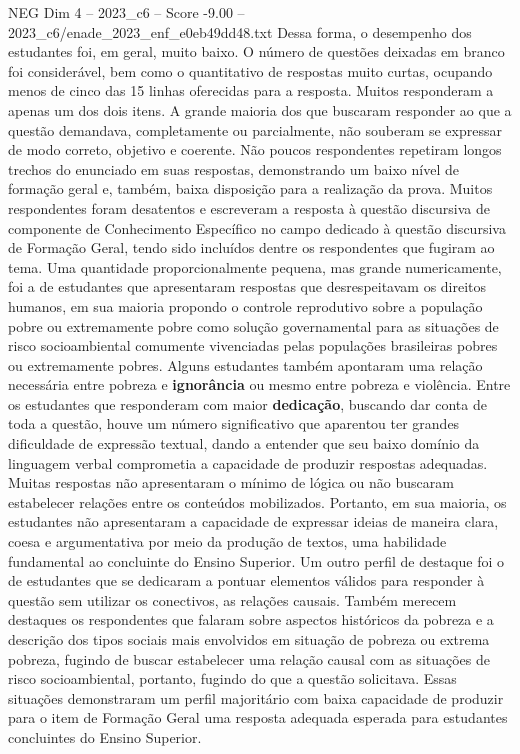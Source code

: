 \begin{textsample}{NEG Dim 4 – 2023\_c6 – Score -9.00 – 2023\_c6/enade\_2023\_enf\_e0eb49dd48.txt}
Dessa forma, o desempenho dos estudantes foi, em geral, muito baixo.
O número de questões deixadas em branco foi considerável, bem como o quantitativo de respostas muito curtas, ocupando menos de cinco das 15 linhas oferecidas para a resposta.
Muitos responderam a apenas um dos dois itens.
A grande maioria dos que buscaram responder ao que a questão demandava, completamente ou parcialmente, não souberam se expressar de modo correto, objetivo e coerente.
Não poucos respondentes repetiram longos trechos do enunciado em suas respostas, demonstrando um baixo nível de formação geral e, também, baixa disposição para a realização da prova.
Muitos respondentes foram desatentos e escreveram a resposta à questão discursiva de componente de Conhecimento Específico no campo dedicado à questão discursiva de Formação Geral, tendo sido incluídos dentre os respondentes que fugiram ao tema.
Uma quantidade proporcionalmente pequena, mas grande numericamente, foi a de estudantes que apresentaram respostas que desrespeitavam os direitos humanos, em sua maioria propondo o controle reprodutivo sobre a população pobre ou extremamente pobre como solução governamental para as situações de risco socioambiental comumente vivenciadas pelas populações brasileiras pobres ou extremamente pobres.
Alguns estudantes também apontaram uma relação necessária entre pobreza e \textbf{ignorância} ou mesmo entre pobreza e violência.
Entre os estudantes que responderam com maior \textbf{dedicação}, buscando dar conta de toda a questão, houve um número significativo que aparentou ter grandes dificuldade de expressão textual, dando a entender que seu baixo domínio da linguagem verbal comprometia a capacidade de produzir respostas adequadas.
Muitas respostas não apresentaram o mínimo de lógica ou não buscaram estabelecer relações entre os conteúdos mobilizados.
Portanto, em sua maioria, os estudantes não apresentaram a capacidade de expressar ideias de maneira clara, coesa e argumentativa por meio da produção de textos, uma habilidade fundamental ao concluinte do Ensino Superior.
Um outro perfil de destaque foi o de estudantes que se dedicaram a pontuar elementos válidos para responder à questão sem utilizar os conectivos, as relações causais.
Também merecem destaques os respondentes que falaram sobre aspectos históricos da pobreza e a descrição dos tipos sociais mais envolvidos em situação de pobreza ou extrema pobreza, fugindo de buscar estabelecer uma relação causal com as situações de risco socioambiental, portanto, fugindo do que a questão solicitava.
Essas situações demonstraram um perfil majoritário com baixa capacidade de produzir para o item de Formação Geral uma resposta adequada esperada para estudantes concluintes do Ensino Superior.

\end{textsample}
